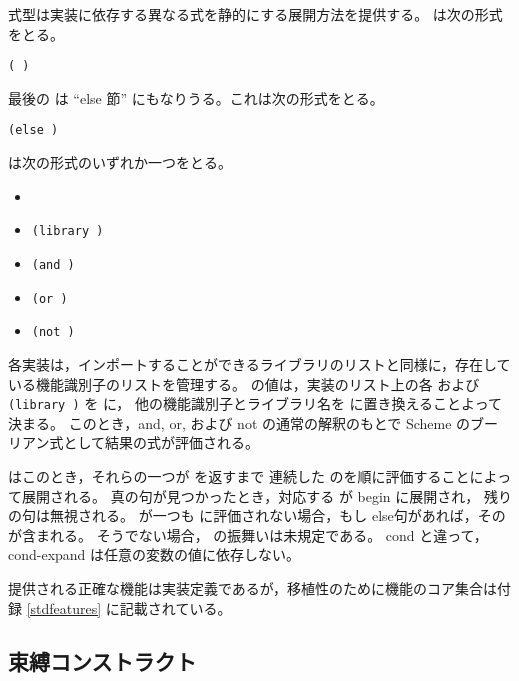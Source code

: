 \begin{entry}{%
}

\syntax
{} 式型は実装に依存する異なる式を静的にする展開方法を提供する。
 は次の形式をとる。

{\tt(  \dotsfoo)}

最後の  は ``else 節'' にもなりうる。これは次の形式をとる。

{\tt(else  \dotsfoo)}

 は次の形式のいずれか一つをとる。

\begin{itemize}
\item {\tt{}}
\item {\tt(library )}
\item {\tt(and  \dotsfoo)}
\item {\tt(or  \dotsfoo)}
\item {\tt(not )}
\end{itemize}

\semantics
各実装は，インポートすることができるライブラリのリストと同様に，存在している機能識別子のリストを管理する。
 の値は，実装のリスト上の各  および
{\tt(library )} を \schtrue に，
他の機能識別子とライブラリ名を \schfalse に置き換えることよって決まる。
このとき，{\cf and}, {\cf or}, および {\cf not} の通常の解釈のもとで
Scheme のブーリアン式として結果の式が評価される。

 はこのとき，それらの一つが \schtrue を返すまで
連続した のを順に評価することによって展開される。
真の句が見つかったとき，対応する  が {\cf begin} に展開され，
残りの句は無視される。
 が一つも \schtrue に評価されない場合，もし else句があれば，そのが含まれる。
そうでない場合，  の振舞いは未規定である。
{\cf cond} と違って， {\cf cond-expand} は任意の変数の値に依存しない。

提供される正確な機能は実装定義であるが，移植性のために機能のコア集合は付録 \ref{stdfeatures} に記載されている。

\end{entry}

\subsection{束縛コンストラクト}
\label{bindingsection}

